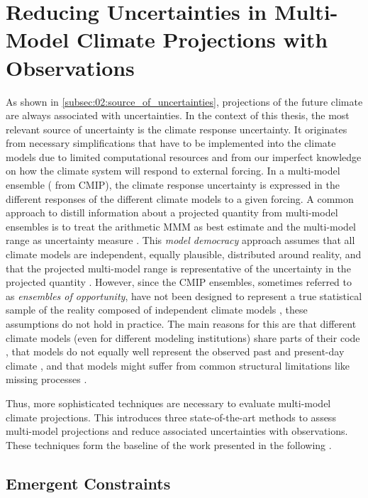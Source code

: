 \section{Reducing Uncertainties in Multi-Model Climate Projections
  with Observations}
\label{sec:02:reducing_uncertainties}

As shown in \cref{subsec:02:source_of_uncertainties}, projections of the future
climate are always associated with uncertainties. In the context of this
thesis, the most relevant source of uncertainty is the climate response
uncertainty. It originates from necessary simplifications that have to be
implemented into the climate models due to limited computational resources and
from our imperfect knowledge on how the climate system will respond to external
forcing. In a multi-model ensemble (\eg{} from \ac{CMIP}), the climate response
uncertainty is expressed in the different responses of the different climate
models to a given forcing. A common approach to distill information about a
projected quantity from multi-model ensembles is to treat the arithmetic
\ac{MMM} as best estimate and the multi-model range as uncertainty measure
\autocite{Collins2013}. This \emph{model democracy} approach assumes that all
climate models are independent, equally plausible, distributed around reality,
and that the projected multi-model range is representative of the uncertainty
in the projected quantity \autocite{Knutti2017a}. However, since the \ac{CMIP}
ensembles, sometimes referred to as \emph{ensembles of opportunity}, have not
been designed to represent a true statistical sample of the reality composed of
independent climate models \autocite{Tebaldi2007}, these assumptions do not
hold in practice. The main reasons for this are that different climate models
(even for different modeling institutions) share parts of their code
\autocite{Abramowitz2019, Knutti2013}, that models do not equally well
represent the observed past and present-day climate \autocite{Gleckler2008,
  Knutti2013}, and that models might suffer from common structural limitations
like missing processes \autocite{Knutti2017a}.

Thus, more sophisticated techniques are necessary to evaluate multi-model
climate projections. This  introduces
three state-of-the-art methods to assess multi-model projections and reduce
associated uncertainties with observations. These techniques form the baseline
of the work presented in the following .


\subsection{Emergent Constraints}
\label{subsec:02:emergent_constraints}

